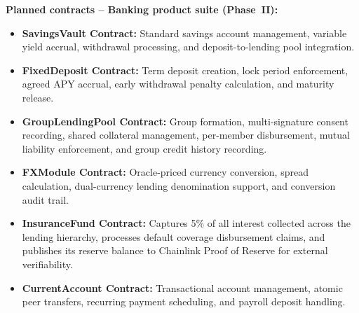 \documentclass[12pt,a4paper]{report}
\begin{document}
\textbf{Planned contracts -- Banking product suite (Phase~II):}
\begin{itemize}[noitemsep]
\item \textbf{SavingsVault Contract:} Standard savings account management, variable yield accrual, withdrawal processing, and deposit-to-lending pool integration.
\item \textbf{FixedDeposit Contract:} Term deposit creation, lock period enforcement, agreed APY accrual, early withdrawal penalty calculation, and maturity release.
\item \textbf{GroupLendingPool Contract:} Group formation, multi-signature consent recording, shared collateral management, per-member disbursement, mutual liability enforcement, and group credit history recording.
\item \textbf{FXModule Contract:} Oracle-priced currency conversion, spread calculation, dual-currency lending denomination support, and conversion audit trail.
\item \textbf{InsuranceFund Contract:} Captures 5\% of all interest collected across the lending hierarchy, processes default coverage disbursement claims, and publishes its reserve balance to Chainlink Proof of Reserve for external verifiability.
\item \textbf{CurrentAccount Contract:} Transactional account management, atomic peer transfers, recurring payment scheduling, and payroll deposit handling.
\end{itemize}
\end{document}
